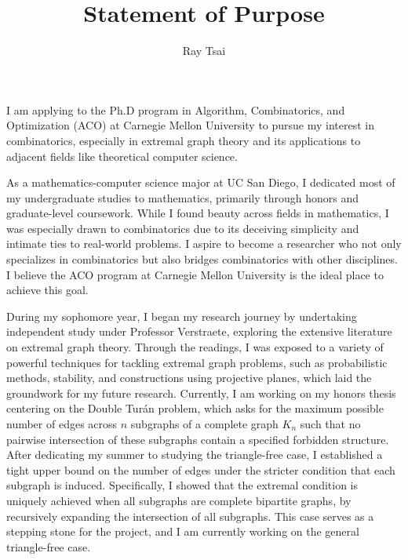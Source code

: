 \documentclass[12pt]{article}
\title{Statement of Purpose}
\author{Ray Tsai}
\date{}
\begin{document}
\maketitle

\vspace{-0.25in}

I am applying to the Ph.D program in Algorithm, Combinatorics, and Optimization (ACO) at Carnegie
Mellon University to pursue my interest in combinatorics, especially in extremal graph theory and
its applications to adjacent fields like theoretical computer science.

As a mathematics-computer science major at UC San Diego, I dedicated most of my undergraduate
studies to mathematics, primarily through honors and graduate-level coursework. While I found beauty
across fields in mathematics, I was especially drawn to combinatorics due to its deceiving
simplicity and intimate ties to real-world problems. I aspire to become a researcher who not only
specializes in combinatorics but also bridges combinatorics with other disciplines. I believe the
ACO program at Carnegie Mellon University is the ideal place to achieve this goal.

During my sophomore year, I began my research journey by undertaking independent study under
Professor Verstraete, exploring the extensive literature on extremal graph theory. Through the
readings, I was exposed to a variety of powerful techniques for tackling extremal graph problems,
such as probabilistic methods, stability, and constructions using projective planes, which laid the
groundwork for my future research. Currently, I am working on my honors thesis centering on the
Double Turán problem, which asks for the maximum possible number of edges across $n$ subgraphs of a
complete graph $K_n$ such that no pairwise intersection of these subgraphs contain a specified
forbidden structure. After dedicating my summer to studying the triangle-free case, I established a
tight upper bound on the number of edges under the stricter condition that each subgraph is induced.
Specifically, I showed that the extremal condition is uniquely achieved when all subgraphs are
complete bipartite graphs, by recursively expanding the intersection of all subgraphs. This case
serves as a stepping stone for the project, and I am currently working on the general triangle-free
case. 
\end{document}
